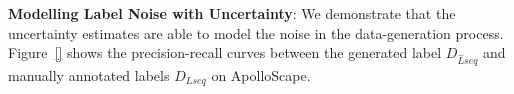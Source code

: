 \textbf{Modelling Label Noise with Uncertainty}: We demonstrate that the uncertainty estimates are able to model the noise in the data-generation process. Figure~\ref{} shows the precision-recall curves between the generated label $D_{\hat{L}seq}$ and manually annotated labels $D_{Lseq}$ on ApolloScape. %




